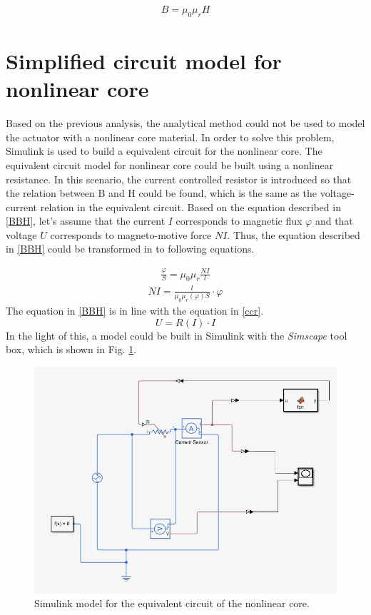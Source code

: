 \documentclass[a4paper]{IEEEtran}
\begin{document}
{\begin{align}
B = \mu_0\mu_rH \label{BBH}
\end{align}

\section{Simplified circuit model for nonlinear core}
Based on the previous analysis, the analytical method could not be used to model the actuator with a nonlinear core material\cite{notes_b}.
In order to solve this problem, Simulink is used to build a equivalent circuit for the nonlinear core.
The equivalent circuit model for nonlinear core could be built using a nonlinear resistance.
In this scenario, the current controlled resistor is introduced so that the relation between B and H
could be found, which is the same as the voltage-current relation in the equivalent circuit.
Based on the equation described in \eqref{BBH}, let's assume that the current $I$ corresponds to magnetic flux $\varphi$ and that voltage $U$
corresponds to magneto-motive force $NI$. Thus, the equation described in \eqref{BBH} could be transformed in to following equations.
 
\begin{align}
	\frac{\varphi}{S} = \mu_0\mu_r \frac{NI}{l} 
\end{align}
\begin{align}
	NI=\frac{l}{\mu_0\mu_r(\varphi)S}\cdot\varphi \label{BBH}
\end{align}
The equation in \eqref{BBH} is in line with the equation in \eqref{ccr}.
\begin{equation}
	U=R(I)\cdot I \label{ccr}
\end{equation}
In the light of this, a model could be built in Simulink with the \emph{Simscape} tool box\cite{Simscape}, which is shown in Fig. \ref{Simulink}.

\begin{figure}[H]
\begin{centering}
\includegraphics[scale=0.5]{Simulink.jpg}
\par\end{centering}   
\caption{Simulink model for the equivalent circuit of the nonlinear core.\label{Simulink}}
\end{figure}  

}
\end{document}
